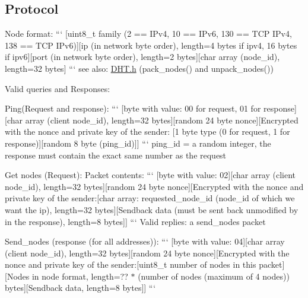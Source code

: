 \subsection*{Protocol }

Node format\+: ``` \mbox{[}uint8\+\_\+t family (2 == I\+Pv4, 10 == I\+Pv6, 130 == T\+C\+P I\+Pv4, 138 == T\+C\+P I\+Pv6)\mbox{]}\mbox{[}ip (in network byte order), length=4 bytes if ipv4, 16 bytes if ipv6\mbox{]}\mbox{[}port (in network byte order), length=2 bytes\mbox{]}\mbox{[}char array (node\+\_\+id), length=32 bytes\mbox{]} ``` see also\+: \hyperlink{_d_h_t_8h_source}{D\+H\+T.\+h} (pack\+\_\+nodes() and unpack\+\_\+nodes())

Valid queries and Responses\+:

Ping(\+Request and response)\+: ``` \mbox{[}byte with value\+: 00 for request, 01 for response\mbox{]}\mbox{[}char array (client node\+\_\+id), length=32 bytes\mbox{]}\mbox{[}random 24 byte nonce\mbox{]}\mbox{[}Encrypted with the nonce and private key of the sender\+: \mbox{[}1 byte type (0 for request, 1 for response)\mbox{]}\mbox{[}random 8 byte (ping\+\_\+id)\mbox{]}\mbox{]} ``` ping\+\_\+id = a random integer, the response must contain the exact same number as the request

Get nodes (Request)\+: Packet contents\+: ``` \mbox{[}byte with value\+: 02\mbox{]}\mbox{[}char array (client node\+\_\+id), length=32 bytes\mbox{]}\mbox{[}random 24 byte nonce\mbox{]}\mbox{[}Encrypted with the nonce and private key of the sender\+:\mbox{[}char array\+: requested\+\_\+node\+\_\+id (node\+\_\+id of which we want the ip), length=32 bytes\mbox{]}\mbox{[}Sendback data (must be sent back unmodified by in the response), length=8 bytes\mbox{]}\mbox{]} ``` Valid replies\+: a send\+\_\+nodes packet

Send\+\_\+nodes (response (for all addresses))\+: ``` \mbox{[}byte with value\+: 04\mbox{]}\mbox{[}char array (client node\+\_\+id), length=32 bytes\mbox{]}\mbox{[}random 24 byte nonce\mbox{]}\mbox{[}Encrypted with the nonce and private key of the sender\+:\mbox{[}uint8\+\_\+t number of nodes in this packet\mbox{]}\mbox{[}Nodes in node format, length=?? $\ast$ (number of nodes (maximum of 4 nodes)) bytes\mbox{]}\mbox{[}Sendback data, length=8 bytes\mbox{]}\mbox{]} ``` 